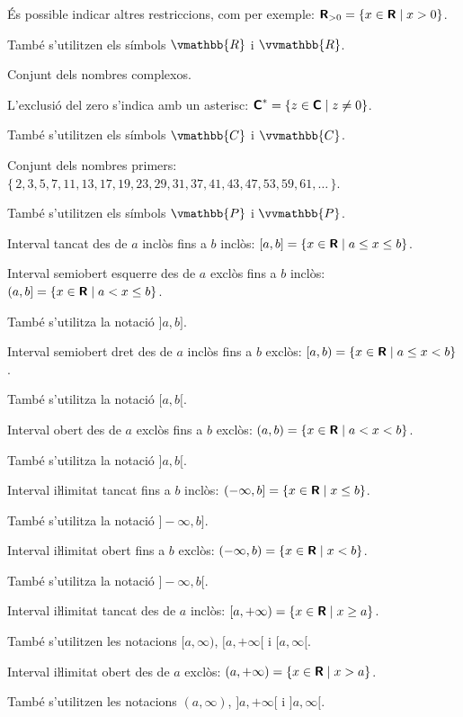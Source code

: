 \begin{list}{}
	 És possible indicar altres restriccions, com per exemple:  ${\boldsymbol{\mathsf{R}}}_{> 0} = \{ x \in {\ensuremath{\boldsymbol{\mathsf{R}}}} \mid x > 0 \}$. 
	 
	 També s'utilitzen els símbols $\vmathbb{R}$ i $\vvmathbb{R}$.
	 
	\item[$\mathsfb{C}$] Conjunt dels nombres complexos.  
	
	L'exclusió del zero s'indica amb un asterisc: ${\boldsymbol{\mathsf{C}}}^* = \{ z \in {\ensuremath{\boldsymbol{\mathsf{C}}}} \mid z \ne 0 \}$.
	
	 També s'utilitzen els símbols $\vmathbb{C}$ i $\vvmathbb{C}$.
	 
	 \item[$\mathsfb{P}$] Conjunt dels nombres primers: $\{\,2,3,5,7,11,13,17,19,23,29,31,37,41,43,47,53,59,61,\ldots\,\}$. 
	 
	 També s'utilitzen els símbols $\vmathbb{P}$ i $\vvmathbb{P}$.
	 
	 \item[{$[a,b]$}] Interval tancat des de $a$ inclòs fins a $b$ inclòs: $[a,b] = \{x \in {\ensuremath{\boldsymbol{\mathsf{R}}}} \mid a \leq x \leq b\}$.
	 
	 \item[{$(a,b]$}] Interval semiobert esquerre des de $a$ exclòs fins a $b$ inclòs: $(a,b] = \{x \in {\ensuremath{\boldsymbol{\mathsf{R}}}} \mid a < x \leq b\}$. 
	 
	 També s'utilitza la notació $]a,b]$.
	 
	 \item[{$[a,b)$}] Interval semiobert dret des de $a$ inclòs fins a $b$ exclòs: $[a,b) = \{x \in {\ensuremath{\boldsymbol{\mathsf{R}}}} \mid a \leq x < b\}$. 
	 
	 També s'utilitza la notació $[a,b[$.
	 
	 \item[{$(a,b)$}] Interval obert des de $a$ exclòs fins a $b$ exclòs: $(a,b) = \{x \in {\ensuremath{\boldsymbol{\mathsf{R}}}} \mid a < x < b\}$. 
	 
	 També s'utilitza la notació $]a,b[$.
	 
	 \item[{$(-\infty,b]$}] Interval iŀlimitat tancat fins a $b$ inclòs: $(-\infty,b] = \{x \in {\ensuremath{\boldsymbol{\mathsf{R}}}} \mid x \leq b\}$.  
	 
	 També s'utilitza la notació $]-\infty,b]$.
	 
	 \item[{$(-\infty,b)$}] Interval iŀlimitat obert fins a $b$ exclòs: $(-\infty,b) = \{x \in {\ensuremath{\boldsymbol{\mathsf{R}}}} \mid x < b\}$. 
	 
	 També s'utilitza la notació $]-\infty,b[$.
	 
	 \item[{$[a,+\infty)$}] Interval iŀlimitat tancat des de $a$ inclòs: $[a, +\infty) = \{x \in {\ensuremath{\boldsymbol{\mathsf{R}}}} \mid  x \geq a\}$. 
	 
	 També s'utilitzen les notacions $[a, \infty)$, $[a, +\infty[$ i $[a, \infty[$.

	\item[{$(a,+\infty)$}] Interval iŀlimitat obert des de $a$ exclòs: $(a, +\infty) = \{x \in {\ensuremath{\boldsymbol{\mathsf{R}}}} \mid  x > a\}$. 
	
	També s'utilitzen les notacions $(a, \infty)$, $]a, +\infty[$ i $]a, \infty[$.
\end{list}
